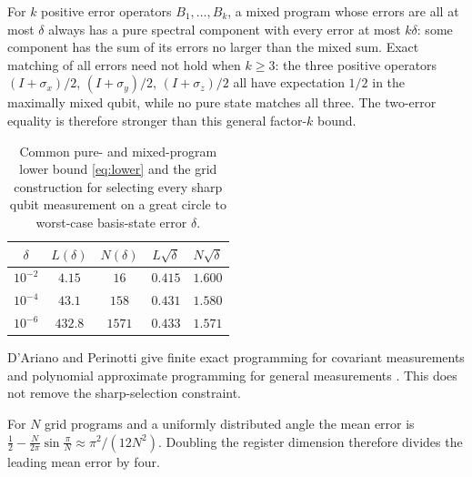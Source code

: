 \documentclass[12pt,a4paper]{article}
\begin{document}
For $k$ positive error operators $B_1,\ldots,B_k$, a mixed program whose errors
are all at most $\delta$ always has a pure spectral component with every error
at most $k\delta$: some component has the sum of its errors no larger than the
mixed sum. Exact matching of all errors need not hold when $k\ge3$: the three
positive operators $(I+\sigma_x)/2$, $(I+\sigma_y)/2$, $(I+\sigma_z)/2$ all
have expectation $1/2$ in the maximally mixed qubit, while no pure state matches
all three.
The two-error equality is therefore stronger than this general factor-$k$ bound.

\begin{table}[ht]
\centering
\begin{tabular}{ccccc}
\toprule
$\delta$ & $L(\delta)$ & $N(\delta)$ & $L\sqrt\delta$ & $N\sqrt\delta$\\
\midrule
$10^{-2}$ & $4.15$ & $16$ & $0.415$ & $1.600$\\
$10^{-4}$ & $43.1$ & $158$ & $0.431$ & $1.580$\\
$10^{-6}$ & $432.8$ & $1571$ & $0.433$ & $1.571$\\
\bottomrule
\end{tabular}
\caption{Common pure- and mixed-program lower bound \eqref{eq:lower} and the grid construction for selecting every sharp qubit measurement on a great circle to worst-case basis-state error $\delta$.}
\label{tab:cost}
\end{table}

D'Ariano and Perinotti give finite exact programming for covariant measurements and polynomial approximate programming for general measurements \cite{DArianoPerinotti2005}. This does not remove the sharp-selection constraint.

For $N$ grid programs and a uniformly distributed angle the mean error is $\frac12-\frac{N}{2\pi}\sin\frac\pi N\approx\pi^2/(12N^2)$. Doubling the register dimension therefore divides the leading mean error by four.
\end{document}
